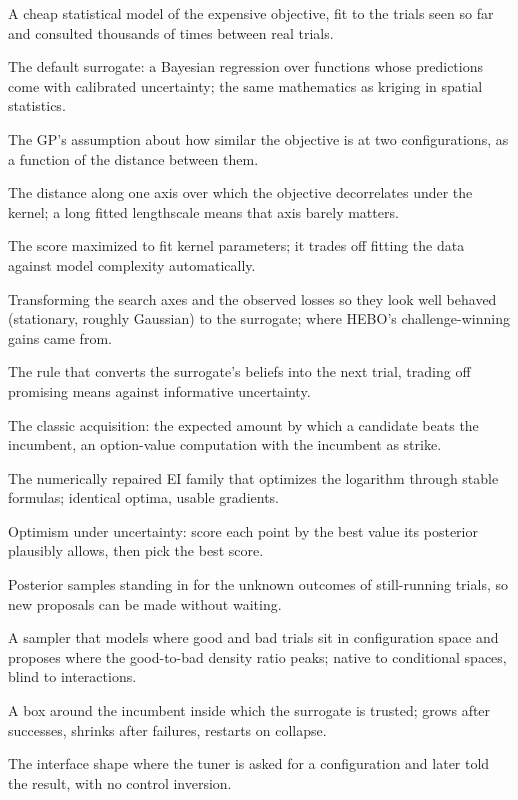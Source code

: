 \begin{description}[leftmargin=1.5em, itemsep=1pt, font=\normalfont\bfseries]
\item[surrogate] A cheap statistical model of the expensive objective,
fit to the trials seen so far and consulted thousands of times between
real trials.
\item[Gaussian process (GP)] The default surrogate: a Bayesian
regression over functions whose predictions come with calibrated
uncertainty; the same mathematics as kriging in spatial statistics.
\item[kernel] The GP's assumption about how similar the objective is at
two configurations, as a function of the distance between them.
\item[lengthscale] The distance along one axis over which the objective
decorrelates under the kernel; a long fitted lengthscale means that
axis barely matters.
\item[marginal likelihood] The score maximized to fit kernel
parameters; it trades off fitting the data against model complexity
automatically.
\item[input/output warping] Transforming the search axes and the
observed losses so they look well behaved (stationary, roughly
Gaussian) to the surrogate; where HEBO's challenge-winning gains came
from.
\item[acquisition function] The rule that converts the surrogate's
beliefs into the next trial, trading off promising means against
informative uncertainty.
\item[expected improvement (EI)] The classic acquisition: the expected
amount by which a candidate beats the incumbent, an option-value
computation with the incumbent as strike.
\item[LogEI] The numerically repaired EI family that optimizes the
logarithm through stable formulas; identical optima, usable gradients.
\item[UCB] Optimism under uncertainty: score each point by the best
value its posterior plausibly allows, then pick the best score.
\item[fantasies] Posterior samples standing in for the unknown outcomes
of still-running trials, so new proposals can be made without waiting.
\item[TPE] A sampler that models where good and bad trials sit in
configuration space and proposes where the good-to-bad density ratio
peaks; native to conditional spaces, blind to interactions.
\item[trust region] A box around the incumbent inside which the
surrogate is trusted; grows after successes, shrinks after failures,
restarts on collapse.
\item[ask-and-tell] The interface shape where the tuner is asked for a
configuration and later told the result, with no control inversion.
\end{description}


